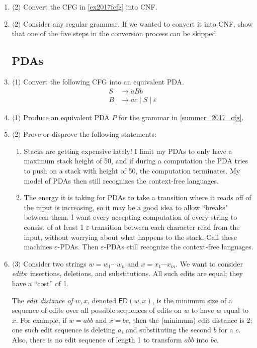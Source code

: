 \documentclass[]{article}
\newcommand{\Level}[1]{{\color{blue} $\langle$#1$\rangle$}}
\begin{document}
\begin{enumerate}
\item \Level{2} Convert the CFG in \cref{ex2017fcfg} into CNF.

\item \Level{2} Consider any regular grammar. If we wanted to convert it into CNF, show that one of the five steps in the conversion process can be skipped.

\subsection{PDAs}

\item \label{ex2017fcfg} \Level{1}  Convert the following CFG into an equivalent PDA.
\begin{align*}
S &\to aBb\\
B &\to ac \;|\;S\;|\;\varepsilon
\end{align*}


\item \Level{1} Produce an equivalent PDA $P$ for the grammar in \cref{summer_2017_cfg}.

\item \Level{2} Prove or disprove the following statements:
\begin{enumerate}
	\item Stacks are getting expensive lately! I limit my PDAs to only have a maximum stack height of 50, and if during a computation the PDA tries to push on a stack with height of 50, the computation terminates. My model of PDAs then still recognizes the context-free languages.
	\item The energy it is taking for PDAs to take a transition where it reads off of the input is increasing, so it may be a good idea to allow ``breaks" between them. I want every accepting computation of every string to consist of at least 1 $\varepsilon$-transition between each character read from the input, without worrying about what happens to the stack. Call these machines $\varepsilon$-PDAs. Then $\varepsilon$-PDAs still recognize the context-free languages.
\end{enumerate}

\item \Level{3} Consider two strings $w = w_1 \cdots w_n$ and $x = x_1 \cdots x_m$. We want to consider \textit{edits}: insertions, deletions, and substitutions. All such edits are equal; they have a ``cost'' of 1.

The \emph{edit distance of $w, x$}, denoted ${\textsf{ED}}(w,x)$, is the minimum size of a sequence of edits over all possible sequences of edits on $w$ to have $w$ equal to $x$. For example, if $w = abb$ and $x = bc$, then the (minimum) edit distance is 2; one such edit sequence is deleting $a$, and substituting the second $b$ for a $c$. Also, there is no edit sequence of length 1 to transform $abb$ into $bc$.


\end{enumerate}
\end{document}
